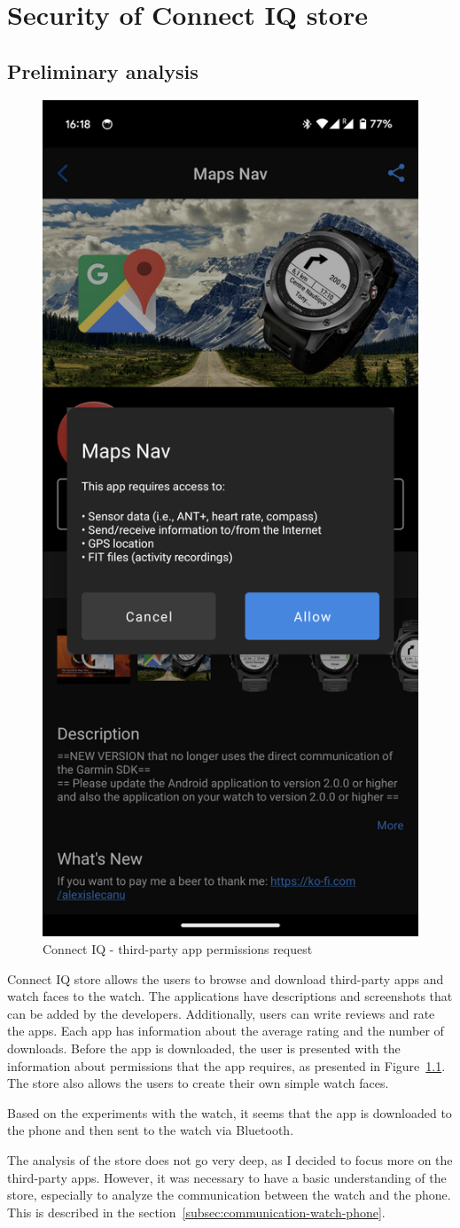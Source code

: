 \chapter{Security of Connect IQ store}
\section{Preliminary analysis}
\begin{figure}[h]
    \centering
    \includegraphics[width=0.3\linewidth]{../../images/connect-iq-app-permissions}
    \caption{Connect IQ - third-party app permissions request}
    \label{fig:connect-iq-store-permissions}
\end{figure}
Connect IQ store allows the users to browse and download third-party apps and watch faces to the watch.
The applications have descriptions and screenshots that can be added by the developers.
Additionally, users can write reviews and rate the apps.
Each app has information about the average rating and the number of downloads.
Before the app is downloaded, the user is presented with the information about permissions that the app requires, as presented in Figure~\ref{fig:connect-iq-store-permissions}.
The store also allows the users to create their own simple watch faces.

Based on the experiments with the watch, it seems that the app is downloaded to the phone and then sent to the watch via Bluetooth.

The analysis of the store does not go very deep, as I decided to focus more on the third-party apps.
However, it was necessary to have a basic understanding of the store, especially to analyze the communication between the watch and the phone.
This is described in the section~\ref{subsec:communication-watch-phone}.

